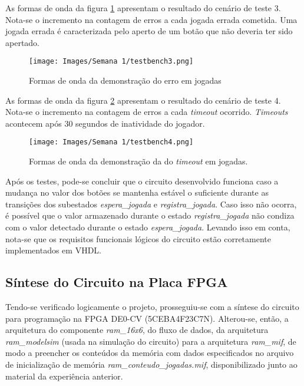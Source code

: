 \documentclass[amsmath,amssymb,floatfix]{report}
\begin{document}
As formas de onda da figura \ref{fig:testbench3} apresentam o resultado do cenário de teste 3. Nota-se o incremento na contagem de erros a cada jogada errada cometida. Uma jogada errada é caracterizada pelo aperto de um botão que não deveria ter sido apertado.

\begin{figure}[H]
    \centering
    \texttt{[image: Images/Semana 1/testbench3.png]}
    \caption{Formas de onda da demonstração do erro em jogadas}
    \label{fig:testbench3}
\end{figure}

As formas de onda da figura \ref{fig:testbench4} apresentam o resultado do cenário de teste 4. Nota-se o incremento na contagem de erros a cada \textit{timeout} ocorrido. \textit{Timeouts} acontecem após 30 segundos de inatividade do jogador.

\begin{figure}[H]
    \centering
    \texttt{[image: Images/Semana 1/testbench4.png]}
    \caption{Formas de onda da demonstração da do \textit{timeout} em jogadas.}
    \label{fig:testbench4}
\end{figure}

Após os testes, pode-se concluir que o circuito desenvolvido funciona caso a mudança no valor dos botões se mantenha estável o suficiente durante as transições dos subestados \textit{espera\_jogada} e \textit{registra\_jogada}. Caso isso não ocorra, é possível que o valor armazenado durante o estado \textit{registra\_jogada} não condiza com o valor detectado durante o estado \textit{espera\_jogada}. Levando isso em conta, nota-se que os requisitos funcionais lógicos do circuito estão corretamente implementados em VHDL.


\subsection{Síntese do Circuito na Placa FPGA}
\label{subsec:sintese}

Tendo-se verificado logicamente o projeto, prosseguiu-se com a síntese do circuito para programação na FPGA DE0-CV (5CEBA4F23C7N). Alterou-se, então, a arquitetura do componente \textit{ram\_16x6}, do fluxo de dados, da arquitetura \textit{ram\_modelsim} (usada na simulação do circuito) para a arquitetura \textit{ram\_mif}, de modo a preencher os conteúdos da memória com dados especificados no arquivo de inicialização de memória \textit{ram\_conteudo\_jogadas.mif}, disponibilizado junto ao material da experiência anterior.
\end{document}
